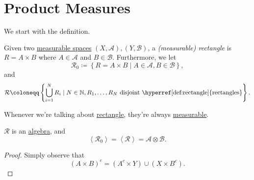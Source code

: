 \section{Product Measures}
We start with the definition.
\begin{definition}[Rectangle]\label{def:rectangle}
	Given two \hyperref[def:measurable-space]{measurable spaces} \((X, \mathcal{A} ), (Y, \mathcal{B} )\),
	a \emph{(measurable) rectangle} is \(R = A\times B\) where \(A\in \mathcal{A} \)
	and \(B\in \mathcal{B} \). Furthermore, we let
	\[
		\mathcal{R} _0 \coloneqq \left\{R = A\times B \mid A\in \mathcal{A} , B\in \mathcal{B} \right\},
	\]
	and
	\[
		\mathcal{R} \coloneqq \left\{\bigcup\limits_{i=1}^{N} R_{i} \mid N\in \mathbb{N} , R_1, \ldots , R_N \text{ disjoint \hyperref[def:rectangle]{rectangles}}\right\}.
	\]
\end{definition}
\begin{note}
	Whenever we're talking about \hyperref[def:rectangle]{rectangle}, they're always \hyperref[def:measurable-set]{measurable}.
\end{note}

\begin{lemma}
	\(\mathcal{R} \) is an \hyperref[def:algebra]{algebra}, and
	\[
		\left< \mathcal{R} _0 \right> = \left< \mathcal{R}  \right> = \mathcal{A} \otimes \mathcal{B}.
	\]
\end{lemma}
\begin{proof}
	Simply observe that
	\[
		(A\times B)^{c} = (A^{c} \times Y)\cup (X\times B^{c} ).
	\]
\end{proof}